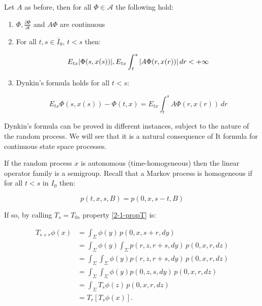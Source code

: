 \begin{proposition}
    Let $A$ as before, then for all $\Phi\in\mathcal{A}$ the following hold:

    \begin{enumerate}
        \item $\Phi,\frac{\partial\Phi}{\partial t}$ and $A\Phi$ are continuous
        \item For all $t,s\in\overline{I}_0$, $t<s$ then:
        
        \[E_{tx}\abs{\Phi(s,x(s))},E_{tx}\int_t^s\abs{A\Phi(r,x(r))}\,dr < +\infty\]
        
        \item Dynkin's formula holds for all $t<s$:
        
        \begin{equation}\label{2-1-dynkform}
            E_{tx}\Phi(s,x(s)) - \Phi(t,x) = E_{tx}\int_t^s A\Phi(r,x(r)) \,dr
        \end{equation}
    \end{enumerate}


\end{proposition}

Dynkin's formula can be proved in different instances, subject to the nature of the random process. We will see 
that it is a natural consequence of It formula for continuous state space processes.

If the random process $x$ is autonomous (time-homogeneous) then the linear operator family is a 
semigroup. Recall that a Markov process is homogeneous if for all $t<s$ in $I_0$ then:

\[p(t,x,s,B) = p(0,x,s-t,B)\]

If so, by calling $T_s=T_{0s}$ property \ref{2-1-propT} is:

\begin{align}
    T_{s+r}\phi(x) & = \int_{\Sigma} \phi(y)\,p(0,x,s+r,dy) \\
    & = \int_{\Sigma}\phi(y)\int_{\Sigma} p(r,z,r+s,dy)\,p(0,x,r,dz) \\
    & = \int_{\Sigma}\int_{\Sigma} \phi(y) p(r,z,r+s,dy)\,p(0,x,r,dz) \\
    & = \int_{\Sigma}\int_{\Sigma} \phi(y) p(0,z,s,dy)\,p(0,x,r,dz) \\
    & = \int_{\Sigma} T_{s}\phi(z) \,p(0,x,r,dz) \\
    & = T_r\left[T_s\phi(x)\right].
\end{align}

